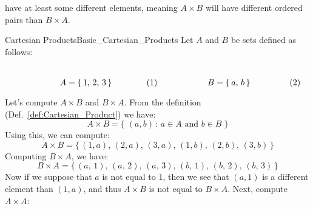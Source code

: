         have at least some different elements, meaning $A\times{B}$ will have
        different ordered pairs than $B\times{A}$.
        \begin{lexample}{Cartesian Products}{Basic_Cartesian_Products}
            Let $A$ and $B$ be sets defined as follows:
            \par
            \begin{subequations}
                \begin{minipage}[b]{0.49\textwidth}
                    \centering
                    \begin{equation}
                        A=\{\,1,\,2,\,3\,\}
                    \end{equation}
                \end{minipage}
                \hfill
                \begin{minipage}[b]{0.49\textwidth}
                    \centering
                    \begin{equation}
                        B=\{\,a,\,b\,\}
                    \end{equation}
                \end{minipage}
            \end{subequations}
            \par\vspace{2.5ex}
            Let's compute $A\times{B}$ and $B\times{A}$. From the definition
            (Def.~\ref{def:Cartesian_Product}) we have:
            \begin{equation}
                A\times{B}=\{\;(a,b)\,:\,a\in{A}\textrm{ and }b\in{B}\;\}
            \end{equation}
            Using this, we can compute:
            \begin{equation}
                A\times{B}=\big\{\,(1,a),\,(2,a),\,(3,a),\,
                                   (1,b),\,(2,b),\,(3,b)\,\big\}
            \end{equation}
            Computing $B\times{A}$, we have:
            \begin{equation}
                B\times{A}=\big\{\,(a,\,1),\,(a,\,2),\,(a,\,3),\,
                                   (b,\,1),\,(b,\,2),\,(b,\,3)\,\big\}
            \end{equation}
            Now if we suppose that $a$ is not equal to 1, then we see that
            $(a,1)$ is a different element than $(1,a)$, and thus $A\times{B}$
            is not equal to $B\times{A}$. Next, compute $A\times{A}$:
            \begin{equation}

\end{equation}
\end{lexample}
